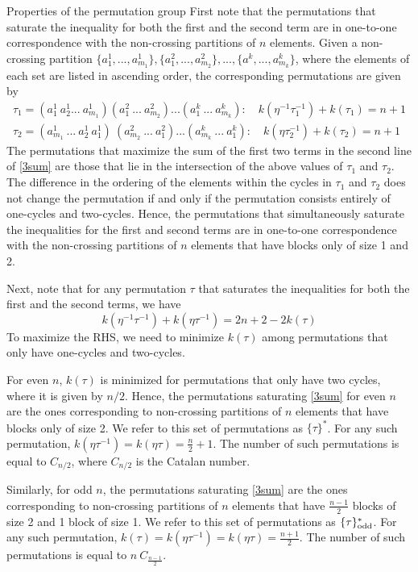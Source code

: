 \documentclass[a4paper,11pt]{article}
\newcommand{\be}{\begin{equation}}
\newcommand{\ee}{\end{equation}}
\begin{document}
\begin{enumerate}
\begin{appendix}
\begin{section}{Properties of the permutation group}
First note that the permutations that saturate the inequality for both the first and the second term are in one-to-one correspondence with the non-crossing partitions of $n$ elements. Given a non-crossing partition $\{a^1_1, ..., a^1_{m_1} \}, \{ a^2_1, ..., a^2_{m_2} \}, ..., \{a^k, ..., a^k_{m_k}\}$, where the elements of each set are listed in ascending order, the corresponding permutations are given by 
\begin{align} 
\tau_1 = (a^1_1~a^1_2 ... ~ a^1_{m_1} ) ( a^2_1~ ... ~a^2_{m_2} ) ... (a_1^k ~ ... ~ a^k_{m_k}) :\quad k(\eta^{-1} \tau_1^{-1})+ k(\tau_1)= n+1\\
\tau_2= (a^1_{m_1} ~ ... ~a^1_2 ~ a^1_1 ) ~ ( a^2_{m_2} ~... ~a^2_1 ) ... (a^k_{m_k} ~ ... ~ a_1^k) :\quad k(\eta \tau_2^{-1})+ k(\tau_2)= n+1
\end{align} 
The permutations that maximize the sum of the first two terms in the second line of \eqref{3sum} are those that lie in the intersection of the above values of $\tau_1$ and $\tau_2$. The difference in the ordering of the elements within the cycles in $\tau_1$ and $\tau_2$ does not change the permutation if and only if the permutation consists entirely of one-cycles and two-cycles. Hence, the permutations that simultaneously saturate the inequalities for the first and second terms are in one-to-one correspondence with the non-crossing partitions of $n$ elements that have blocks only of size 1 and 2. 

Next, note that for any permutation $\tau$ that saturates the inequalities for both the first and the second terms, we have
\be 
k(\eta^{-1}\tau^{-1}) + k(\eta \tau^{-1}) = 2n+2- 2 k(\tau) 
\ee 
To maximize the RHS, we need to minimize $k(\tau)$ among permutations that only have one-cycles and two-cycles. 

For even $n$, $k(\tau)$ is minimized for permutations that only have two cycles, where it is given by $n/2$. Hence, the permutations saturating \eqref{3sum} for even $n$ are the ones corresponding to non-crossing partitions of $n$ elements that have blocks only of size 2. We refer to this set of permutations as $\{\tau\}^{\ast}$. For any such permutation, $k(\eta \tau^{-1})= k(\eta \tau)= \frac{n}{2}+1$. The number of such permutations is equal to $C_{n/2}$, where $C_{n/2}$ is the Catalan number. 

Similarly, for odd $n$, the permutations saturating \eqref{3sum} are the ones corresponding to non-crossing partitions of $n$ elements that have $\frac{n-1}{2}$ blocks of size 2 and 1 block of size 1. We refer to this set of permutations as $\{\tau\}^{\ast}_{\rm odd}$. For any such permutation, $k(\tau)= k(\eta \tau^{-1})= k(\eta \tau)= \frac{n+1}{2}$. The number of such permutations is equal to $n~ C_{\frac{n-1}{2}}$. 
\end{section} 


\end{appendix}
\end{enumerate}
\end{document}
